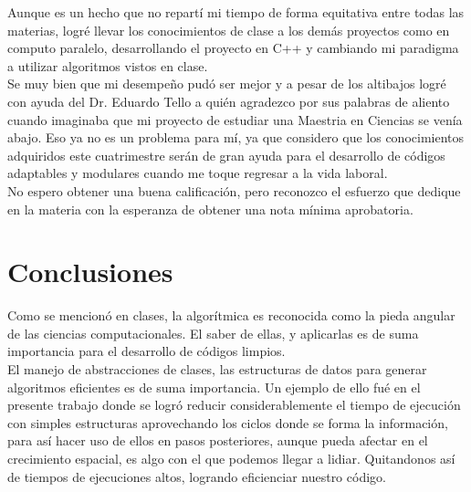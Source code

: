 \documentclass[
	letterpaper, %
	10pt, %
]{CSUniSchoolLabReport}
\begin{document}
Aunque es un hecho que no repartí mi tiempo de forma equitativa entre todas las materias, logré llevar los conocimientos de clase a los demás proyectos como en computo paralelo, desarrollando el proyecto en C++ y cambiando mi paradigma a utilizar algoritmos vistos en clase.\\

Se muy bien que mi desempeño pudó ser mejor y a pesar de los altibajos logré con ayuda del Dr. Eduardo Tello a quién agradezco por sus palabras de aliento cuando imaginaba que mi proyecto de estudiar una Maestria en Ciencias se venía abajo. Eso ya no es un problema para mí, ya que considero que los conocimientos adquiridos este cuatrimestre serán de gran ayuda para el desarrollo de códigos adaptables y modulares cuando me toque regresar a la vida laboral.\\

No espero obtener una buena calificación, pero reconozco el esfuerzo que dedique en la materia con la esperanza de obtener una nota mínima aprobatoria.

\section{Conclusiones}

Como se mencionó en clases, la algorítmica es reconocida como la pieda angular de las ciencias computacionales. El saber de ellas, y aplicarlas es de suma importancia para el desarrollo de códigos limpios.\\

El manejo de abstracciones de clases, las estructuras de datos para generar algoritmos eficientes es de suma importancia. Un ejemplo de ello fué en el presente trabajo donde se logró reducir considerablemente el tiempo de ejecución con simples estructuras aprovechando los ciclos donde se forma la información, para así hacer uso de ellos en pasos posteriores, aunque pueda afectar en el crecimiento espacial, es algo con el que podemos llegar a lidiar. Quitandonos así de tiempos de ejecuciones altos, logrando eficienciar nuestro código.


\printbibliography %

\end{document}
